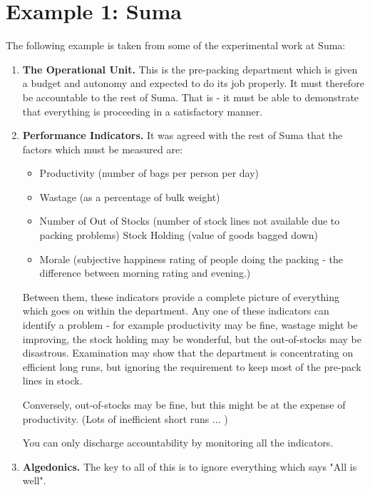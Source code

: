 \section*{Example 1: Suma}
The following example is taken from some of the experimental work at Suma:

\begin{enumerate}
  \item \textbf{The Operational Unit.} This is the pre-packing department which is given a budget and autonomy and expected to do its job properly. It must therefore be accountable to the rest of Suma. That is - it must be able to demonstrate that everything is proceeding in a satisfactory manner.

  \item \textbf{Performance Indicators.} It was agreed with the rest of Suma that the factors which must be measured are:

  \begin{itemize}
    \item Productivity (number of bags per person per day)

    \item Wastage (as a percentage of bulk weight)

    \item Number of Out of Stocks (number of stock lines not available due to packing problems) Stock Holding (value of goods bagged down)

    \item Morale (subjective happiness rating of people doing the packing - the difference between morning rating and evening.)

  \end{itemize}Between them, these indicators provide a complete picture of everything which goes on within the department. Any one of these indicators can identify a problem - for example productivity may be fine, wastage might be improving, the stock holding may be wonderful, but the out-of-stocks may be disastrous. Examination may show that the department is concentrating on efficient long runs, but ignoring the requirement to keep most of the pre-pack lines in stock.

Conversely, out-of-stocks may be fine, but this might be at the expense of productivity. (Lots of inefficient short runs ... )

You can only discharge accountability by monitoring all the indicators.

  \item \textbf{Algedonics.} The key to all of this is to ignore everything which says "All is well".

\end{enumerate}

